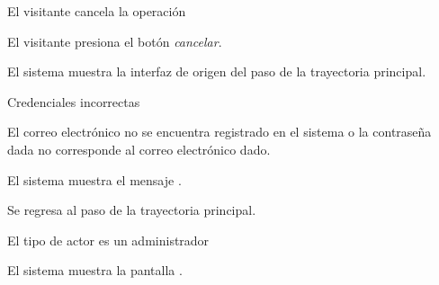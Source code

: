 {  \begin{trayectoriaAlternativa}[ta:cancelar]
    {El visitante cancela la operación}

    \item El visitante presiona el botón \textit{cancelar}.

    \item El sistema muestra la interfaz de origen del paso
       de la trayectoria principal.

  \end{trayectoriaAlternativa}

  \begin{trayectoriaAlternativa}
    {Credenciales incorrectas}

    \item El correo electrónico no se encuentra registrado en el sistema o la
      contraseña dada no corresponde al correo electrónico dado.

    \item El sistema muestra el mensaje
      .

    \item Se regresa al paso  de la trayectoria
      principal.

  \end{trayectoriaAlternativa}

  \begin{trayectoriaAlternativa}[ta:administrador]
    {El tipo de actor es un administrador}

    \item El sistema muestra la pantalla
      .

  \end{trayectoriaAlternativa}
}
